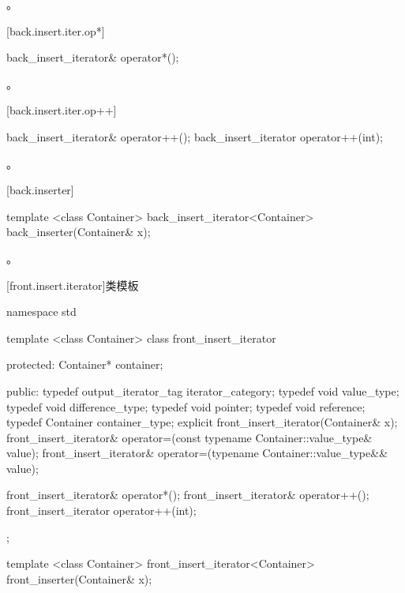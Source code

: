 \begin{itemdescr}
\pnum
\effects
{}

\pnum
\returns
{}。
\end{itemdescr}

[back.insert.iter.op*]{}

%
\begin{itemdecl}
back_insert_iterator& operator*();
\end{itemdecl}

\begin{itemdescr}
\pnum
\returns
{}。
\end{itemdescr}

[back.insert.iter.op++]{}

%
\begin{itemdecl}
back_insert_iterator& operator++();
back_insert_iterator  operator++(int);
\end{itemdecl}

\begin{itemdescr}
\pnum
\returns
{}。
\end{itemdescr}

[back.inserter]{ }

%
\begin{itemdecl}
template <class Container>
  back_insert_iterator<Container> back_inserter(Container& x);
\end{itemdecl}

\begin{itemdescr}
\pnum
\returns
{}。
\end{itemdescr}

[front.insert.iterator]{类模板}

%
\begin{codeblock}
namespace std {
  template <class Container>
  class front_insert_iterator {
  protected:
    Container* container;

  public:
    typedef output_iterator_tag iterator_category;
    typedef void value_type;
    typedef void difference_type;
    typedef void pointer;
    typedef void reference;
    typedef Container container_type;
    explicit front_insert_iterator(Container& x);
    front_insert_iterator& operator=(const typename Container::value_type& value);
    front_insert_iterator& operator=(typename Container::value_type&& value);

    front_insert_iterator& operator*();
    front_insert_iterator& operator++();
    front_insert_iterator  operator++(int);
  };

  template <class Container>
    front_insert_iterator<Container> front_inserter(Container& x);
}
\end{codeblock}

